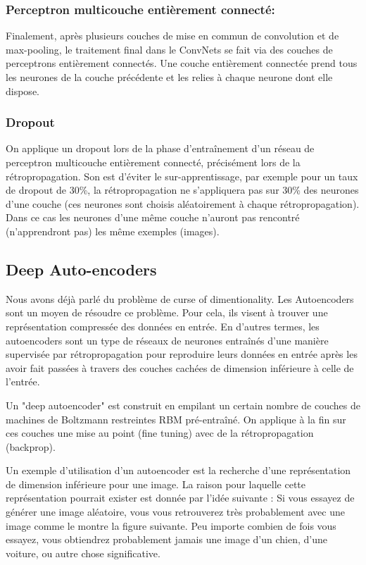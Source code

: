 \subsubsection{Perceptron multicouche entièrement connecté:}

Finalement, après plusieurs couches de mise en commun de convolution et de max-pooling, le traitement final dans le ConvNets se fait via des couches de perceptrons entièrement connectés. Une couche entièrement connectée prend tous les neurones de la couche précédente et les relies à chaque neurone dont elle dispose.

\subsubsection{Dropout}
On applique un dropout lors de la phase d'entraînement d'un réseau de perceptron  multicouche entièrement connecté, précisément lors de la rétropropagation. Son est d'éviter le sur-apprentissage, par exemple pour un taux de dropout de 30\%, la rétropropagation ne s'appliquera pas sur 30\% des neurones d'une couche (ces neurones sont choisis aléatoirement à chaque rétropropagation). Dans ce cas les neurones d'une même couche n'auront pas rencontré (n'apprendront pas) les même exemples (images).

\subsection{Deep Auto-encoders}

Nous avons déjà parlé du problème de curse of dimentionality. Les Autoencoders sont un moyen de résoudre ce problème. Pour cela, ils visent à trouver une représentation compressée des données en entrée.
En d'autres termes, les autoencoders sont un type de réseaux de neurones entraînés d'une manière supervisée par rétropropagation pour reproduire leurs données en entrée après les avoir fait passées à travers des couches cachées de dimension inférieure à celle de l'entrée.


Un "deep autoencoder" est construit en empilant un certain nombre de couches de machines de Boltzmann restreintes RBM pré-entraîné. On applique à la fin sur ces couches une mise au point (fine tuning) avec de la rétropropagation (backprop).

Un exemple d'utilisation d'un autoencoder est la recherche d'une représentation de dimension inférieure pour une image. La raison pour laquelle cette représentation pourrait exister est donnée par l'idée suivante :
Si vous essayez de générer une image aléatoire, vous vous  retrouverez très probablement avec une image comme le montre la figure suivante. Peu importe combien de fois vous essayez, vous obtiendrez probablement jamais une image d'un chien, d'une voiture, ou autre chose significative.



